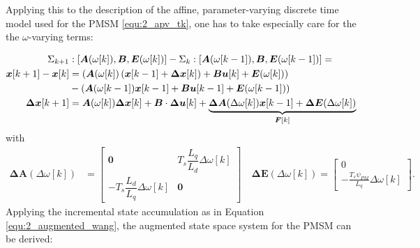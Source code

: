 Applying this to the description of the affine, parameter-varying discrete time model used for the PMSM \eqref{equ:2_apv_tk}, one has to take especially care for the the $\omega$-varying terms:

\begin{align*}
	\Sigma_{k+1}&: \left[\bm{A}(\omega[k]),\bm{B},\bm{E}(\omega[k])\right] - \Sigma_k:  \left[\bm{A}(\omega[k-1]),\bm{B},\bm{E}(\omega[k-1])\right] = \\
	{\bm{x}}[k+1] - {\bm{x}}[k] &= \left( \bm{A}(\omega[k]) \left({\bm{x}}[k-1] + \bm{\Delta x}[k] \right)+ \bm{B} \bm{u}[k] + \bm{E}(\omega[k])  \right) \\
	& - \left(\bm{A}(\omega[k-1]){\bm{x}}[k-1] + \bm{B} \bm{u}[k-1] + \bm{E}(\omega[k-1]) \right) \\
	\bm{\Delta x}[k+1] &= \bm{A}(\omega[k]) \bm{\Delta x}[k] + \bm{B} \cdot \bm{\Delta u}[k] + \underbrace{\bm{\Delta A}(\Delta \omega[k]) {\bm{x}}[k-1] + \bm{\Delta E}(\Delta \omega[k])}_{\bm{F}[k]} \\
\end{align*}
with
\begin{align*}
	\bm{\Delta A}(\Delta \omega[k]) &=
	\begin{bmatrix} 
		\bm{0} & T_s\dfrac{L_q}{L_d}\Delta\omega[k] \\
		-T_s\dfrac{L_d}{L_q}\Delta\omega[k] & \bm{0}
	\end{bmatrix} 
	\quad
	\bm{\Delta E}(\Delta \omega[k]) = 
	 \begin{bmatrix} 0 \\
	 	-\frac{T_s\psi_{PM}}{L_q} \Delta \omega[k] 
	 \end{bmatrix}.
\end{align*}
Applying the incremental state accumulation as in Equation \eqref{equ:2_augmented_wang}, the augmented state space system for the PMSM can be derived:
